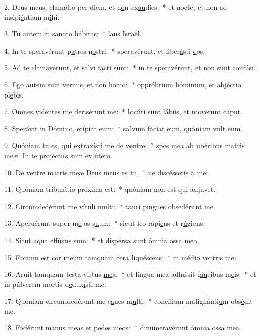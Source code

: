2. Deus meus, clamábo per diem, et n\uline{o}n ex\uline{áu}dies:~* et nocte, et non ad insipi\uline{é}ntiam m\uline{i}hi.\par 
3. Tu autem in s\uline{a}ncto h\uline{á}bitas:~* laus \uline{I}sraël.\par 
4. In te speravérunt p\uline{a}tres n\uline{o}stri:~* speravérunt, et liber\uline{á}sti \uline{e}os.\par 
5. Ad te clamavérunt, et s\uline{a}lvi f\uline{a}cti sunt:~* in te speravérunt, et non s\uline{u}nt conf\uline{ú}si.\par 
6. Ego autem sum vermis, \uline{e}t non h\uline{o}mo:~* oppróbrium hóminum, et abj\uline{é}ctio pl\uline{e}bis.\par 
7. Omnes vidéntes me d\uline{e}ris\uline{é}runt me:~* locúti sunt lábiis, et mov\uline{é}runt c\uline{a}put.\par 
8. Sperávit in Dómino, er\uline{í}piat \uline{e}um:~* salvum fáciat eum, quóni\uline{a}m vult \uline{e}um.\par 
9. Quóniam tu es, qui extraxísti m\uline{e} de v\uline{e}ntre:~* spes mea ab ubéribus matris meæ. In te projéctus s\uline{u}m ex \uline{ú}tero.\par 
10. De ventre matris meæ Deus m\uline{e}us \uline{e}s tu,~* ne disc\uline{é}sseris \uline{a} me:\par 
11. Quóniam tribulátio pr\uline{ó}xim\uline{a} est:~* quóniam non \uline{e}st qui \uline{á}djuvet.\par 
12. Circumdedérunt me v\uline{í}tuli m\uline{u}lti:~* tauri pingues \uline{o}bsed\uline{é}runt me.\par 
13. Aperuérunt super m\uline{e} os s\uline{u}um:~* sicut leo rápi\uline{e}ns et r\uline{ú}giens.\par 
14. Sicut \uline{a}qua eff\uline{ú}sus sum:~* et dispérsa sunt ómnia \uline{o}ssa m\uline{e}a.\par 
15. Factum est cor meum tamquam c\uline{e}ra li\uline{qué}scens:~* in médio v\uline{e}ntris m\uline{e}i.\par 
16. Aruit tamquam testa virtus \uline{me}a,~† et lingua mea adhǽsit f\uline{áu}cibus m\uline{e}is:~* et in púlverem mortis d\uline{e}dux\uline{í}sti me.\par 
17. Quóniam circumdedérunt me c\uline{a}nes m\uline{u}lti:~* concílium malignánti\uline{u}m obs\uline{é}dit me.\par 
18. Fodérunt manus meas et p\uline{e}des m\uline{e}os:~* dinumeravérunt ómnia \uline{o}ssa m\uline{e}a.\par 

